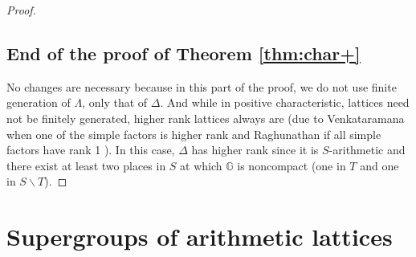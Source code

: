 \documentclass[11pt]{article}
\numberwithin{equation}{section}\providecommand{\llangle}{\langle\!\langle}\providecommand{\rrangle}{\rangle\!\rangle}\providecommand{\Asterisk}{\ast}
\let\bs\backslash
\newcommand{\bbG}{\ensuremath{\mathbb{G}}}
\theoremstyle{definition}
\begin{document}
\begin{proof}
\subsection{End of the proof of Theorem \ref{thm:char+}} No changes are necessary because in this part of the proof, we do not use finite generation of $\Lambda$, only that of $\Delta$. And while in positive characteristic, lattices need not be finitely generated, higher rank lattices always are (due to Venkataramana when one of the simple factors is higher rank \cite{venky-thesis} and Raghunathan if all simple factors have rank 1 \cite{raghunathan-fg}). In this case, $\Delta$ has higher rank since it is $S$-arithmetic and there exist at least two places in $S$ at which $\bbG$ is noncompact (one in $T$ and one in $S\bs T$). \end{proof}

\section{Supergroups of arithmetic lattices}
\label{sec:venky}
\end{document}
